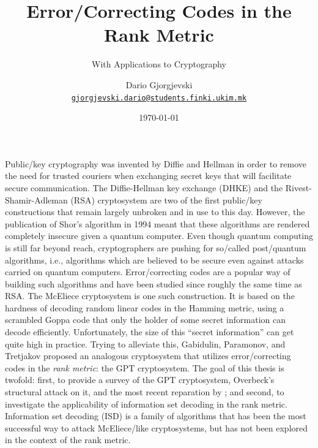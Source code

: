 \documentclass[version=last, paper=A4, parskip=half, oneside,%
toc=bibliography, toc=listof, listof=leveldown]{scrbook}
\title{Error\-/Correcting Codes in the Rank Metric}
\subtitle{With Applications to Cryptography}
\author{%
  Dario Gjorgjevski\\%
  \href{mailto:gjorgjevski.dario@students.finki.ukim.mk}{\nolinkurl{gjorgjevski.dario@students.finki.ukim.mk}}}
\date{\today}
\theoremstyle{plain}
\theoremstyle{definition}
\theoremstyle{remark}
\begin{document}

\newcommand*{\listofloaname}{\listalgorithmcfname}
\renewcommand{\listofalgorithms}{\listoftoc{loa}}

\frontmatter{}

\maketitle{}

\tableofcontents{}
\listoffigures{}
\listoftables{}
\listofalgorithms{}
\listoflistings{}


Public\-/key cryptography was invented by Diffie and Hellman in order to remove
the need for trusted couriers when exchanging secret keys that will facilitate
secure communication.  The Diffie\--Hellman key exchange (DHKE) and the
Rivest\--Shamir\--Adleman (RSA) cryptosystem are two of the first public\-/key
constructions that remain largely unbroken and in use to this day.  However, the
publication of Shor's algorithm in 1994 meant that these algorithms are rendered
completely insecure given a quantum computer.  Even though quantum computing is
still far beyond reach, cryptographers are pushing for so\-/called
post\-/quantum algorithms, i.e., algorithms which are believed to be secure even
against attacks carried on quantum computers.  Error\-/correcting codes are a
popular way of building such algorithms and have been studied since roughly the
same time as RSA\@.  The McEliece cryptosystem is one such construction.  It is
based on the hardness of decoding random linear codes in the Hamming metric,
using a scrambled Goppa code that only the holder of some secret information can
decode efficiently.  Unfortunately, the size of this \enquote{secret
  information} can get quite high in practice.  Trying to alleviate this,
Gabidulin, Paramonov, and Tretjakov proposed an analogous cryptosystem that
utilizes error\-/correcting codes in the \emph{rank metric}: the GPT
cryptosystem.  The goal of this thesis is twofold: first, to provide a survey of
the GPT cryptosystem, Overbeck's structural attack on it, and the most recent
reparation by \textcite{Loi17}; and second, to investigate the applicability of
information set decoding in the rank metric.  Information set decoding (ISD) is
a family of algorithms that has been the most successful way to attack
McEliece\-/like cryptosystems, but has not been explored in the context of the
rank metric.
\end{document}
